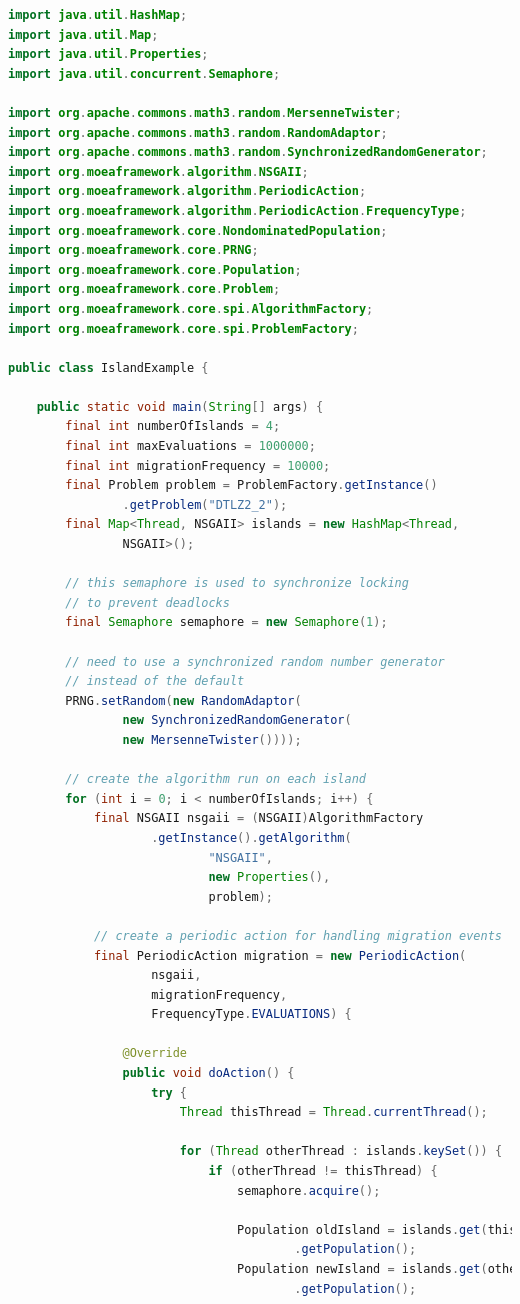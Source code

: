 {\begin{lstlisting}[language=Java]
import java.util.HashMap;
import java.util.Map;
import java.util.Properties;
import java.util.concurrent.Semaphore;

import org.apache.commons.math3.random.MersenneTwister;
import org.apache.commons.math3.random.RandomAdaptor;
import org.apache.commons.math3.random.SynchronizedRandomGenerator;
import org.moeaframework.algorithm.NSGAII;
import org.moeaframework.algorithm.PeriodicAction;
import org.moeaframework.algorithm.PeriodicAction.FrequencyType;
import org.moeaframework.core.NondominatedPopulation;
import org.moeaframework.core.PRNG;
import org.moeaframework.core.Population;
import org.moeaframework.core.Problem;
import org.moeaframework.core.spi.AlgorithmFactory;
import org.moeaframework.core.spi.ProblemFactory;

public class IslandExample {
	
	public static void main(String[] args) {
		final int numberOfIslands = 4;
		final int maxEvaluations = 1000000;
		final int migrationFrequency = 10000;
		final Problem problem = ProblemFactory.getInstance()
				.getProblem("DTLZ2_2");
		final Map<Thread, NSGAII> islands = new HashMap<Thread,
				NSGAII>();
		
		// this semaphore is used to synchronize locking
		// to prevent deadlocks
		final Semaphore semaphore = new Semaphore(1);
		
		// need to use a synchronized random number generator
		// instead of the default
		PRNG.setRandom(new RandomAdaptor(
				new SynchronizedRandomGenerator(
				new MersenneTwister())));
		
		// create the algorithm run on each island
		for (int i = 0; i < numberOfIslands; i++) {
			final NSGAII nsgaii = (NSGAII)AlgorithmFactory
					.getInstance().getAlgorithm(
							"NSGAII",
							new Properties(),
							problem);
			
			// create a periodic action for handling migration events
			final PeriodicAction migration = new PeriodicAction(
					nsgaii,
					migrationFrequency,
					FrequencyType.EVALUATIONS) {

				@Override
				public void doAction() {
					try {
						Thread thisThread = Thread.currentThread();
						
						for (Thread otherThread : islands.keySet()) {
							if (otherThread != thisThread) {
								semaphore.acquire();
								
								Population oldIsland = islands.get(thisThread)
										.getPopulation();
								Population newIsland = islands.get(otherThread)
										.getPopulation();
										

\end{lstlisting}}
